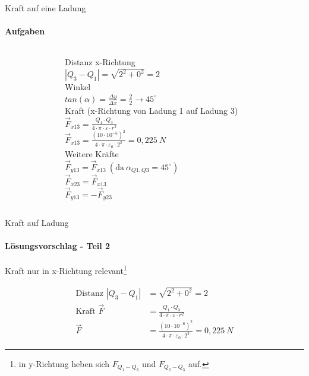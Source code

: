 \begin{frame}{Kraft auf eine Ladung}
\label{KraftAufLadungAufgabe1-3}
 \framesubtitle{Aufgaben}
\begin{columns}
 \begin{figure}
\end{figure}
 Distanz x-Richtung %
 \\
 $|Q_3-Q_1| =\sqrt{2^2+0^2}=2$\\
 Winkel\\
 $tan(\alpha) =\frac{\Delta y}{\Delta x}=\frac{2}{2}\rightarrow 45^\circ$\\
 Kraft (x-Richtung von Ladung 1 auf Ladung 3)%
 \\
 $\vec{F}_{x13} = \frac{Q_1 \cdot Q_3}{4 \cdot \pi \cdot \varepsilon\cdot r^2}$
 \\
 $\vec{F}_{x13} = \frac{(10\cdot 10^{-6})^2}{4 \cdot \pi \cdot \varepsilon_0\cdot 2^2}=0,225\ N$\\
 Weitere Kräfte\\
 $\vec{F}_{y13} = \vec{F}_{x13}\ (\text{da}\ \alpha_{Q1,Q3}=45^\circ)$\\
 $\vec{F}_{x23} =\vec{F}_{x13}$
\\
$\vec{F}_{y13} = -\vec{F}_{y23}$
\end{columns}
\end{frame}

\begin{frame}{Kraft auf Ladung}
\framesubtitle{Lösungsvorschlag - Teil 2}
Kraft nur in x-Richtung relevant\footnote{in y-Richtung heben sich $F_{Q_1-Q_3}$ und $F_{Q_2-Q_3}$ auf.}

\begin{align}
 \text{Distanz } |Q_3-Q_1| &=\sqrt{2^2+0^2}=2\\
 \text{Kraft } \vec{F} &= \frac{Q_1 \cdot Q_3}{4 \cdot \pi \cdot \varepsilon\cdot r^2}
 \\
 \vec{F} &= \frac{(10\cdot 10^{-6})^2}{4 \cdot \pi \cdot \varepsilon_0\cdot 2^2}=0,225\ N
\end{align}
\end{frame}
